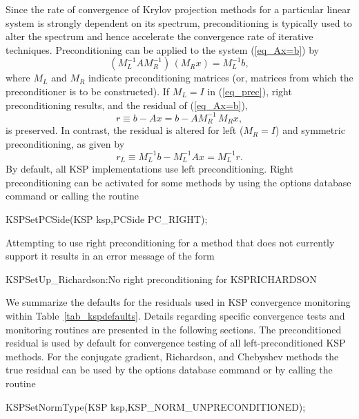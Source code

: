 Since the rate of convergence of Krylov projection methods for a
particular linear system is strongly dependent on its spectrum,
preconditioning is typically used to alter the spectrum and hence
accelerate the convergence rate of iterative techniques.
Preconditioning can be applied to the system (\ref{eq_Ax=b}) by
\begin{equation}
   (M_L^{-1} A M_R^{-1}) \, (M_R x) = M_L^{-1} b,
\label{eq_prec}
\end{equation}
where $ M_L$ and $ M_R $ indicate preconditioning matrices (or, matrices
from which the preconditioner is to be constructed).  If $ M_L = I $
in (\ref{eq_prec}), right preconditioning results, and the
residual of (\ref{eq_Ax=b}),
  \[ r \equiv b - Ax = b - A M_R^{-1} \, M_R x, \]
is preserved.  In contrast, the residual is altered for left
($ M_R = I $) and symmetric preconditioning, as given by
  \[ r_L \equiv M_L^{-1} b - M_L^{-1} A x = M_L^{-1} r. \]
By default, all KSP implementations use left preconditioning.
Right preconditioning can be activated for some methods by
using the options database command  or
calling the routine 
\begin{tabbing}
  KSPSetPCSide(KSP ksp,PCSide PC\_RIGHT);
\end{tabbing}
Attempting to use right preconditioning for a method that
does not currently support it results in an error message of the form
\begin{tabbing}
   KSPSetUp\_Richardson:No right preconditioning for KSPRICHARDSON
\end{tabbing}

We summarize the defaults for the residuals used in KSP convergence
monitoring within Table~\ref{tab_kspdefaults}.  Details regarding
specific convergence tests and monitoring routines are presented in
the following sections.  The preconditioned residual is used by
default for convergence testing of all left-preconditioned KSP
methods. For the conjugate gradient, Richardson, and
Chebyshev methods the true residual can be used by
the options database command  or by calling the routine
\begin{tabbing}
  KSPSetNormType(KSP ksp,KSP\_NORM\_UNPRECONDITIONED);
\end{tabbing}

